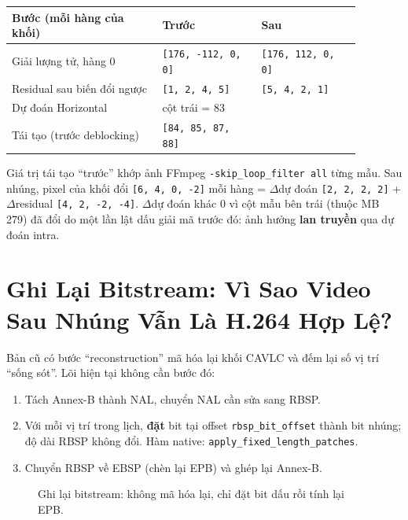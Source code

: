 \documentclass[11pt,a4paper]{article}
\begin{document}
\begin{center}
\small
\begin{tabular}{p{0.38\linewidth}p{0.25\linewidth}p{0.25\linewidth}}
\toprule
Bước (mỗi hàng của khối) & Trước & Sau \\
\midrule
Giải lượng tử, hàng 0 & \texttt{[176, -112, 0, 0]} & \texttt{[176, 112, 0, 0]} \\
Residual sau biến đổi ngược & \texttt{[1, 2, 4, 5]} & \texttt{[5, 4, 2, 1]} \\
Dự đoán Horizontal & cột trái = 83 & \\
Tái tạo (trước deblocking) & \texttt{[84, 85, 87, 88]} & \\
\bottomrule
\end{tabular}
\end{center}

Giá trị tái tạo ``trước'' khớp ảnh FFmpeg \texttt{-skip\_loop\_filter all} từng mẫu.
Sau nhúng, pixel của khối đổi \texttt{[6, 4, 0, -2]} mỗi hàng = \(\Delta\)dự đoán
\texttt{[2, 2, 2, 2]} + \(\Delta\)residual \texttt{[4, 2, -2, -4]}. \(\Delta\)dự đoán khác
0 vì cột mẫu bên trái (thuộc MB 279) đã đổi do một lần lật dấu giải mã trước đó:
ảnh hưởng \textbf{lan truyền} qua dự đoán intra.

\section{Ghi Lại Bitstream: Vì Sao Video Sau Nhúng Vẫn Là H.264 Hợp Lệ?}

Bản cũ có bước ``reconstruction'' mã hóa lại khối CAVLC và đếm lại số vị trí ``sống
sót''. Lõi hiện tại không cần bước đó:

\begin{enumerate}[leftmargin=*]
  \item Tách Annex-B thành NAL, chuyển NAL cần sửa sang RBSP.
  \item Với mỗi vị trí trong lịch, \textbf{đặt} bit tại offset
  \texttt{rbsp\_bit\_offset} thành bit nhúng; độ dài RBSP không đổi. Hàm native:
  \texttt{apply\_fixed\_length\_patches}.
  \item Chuyển RBSP về EBSP (chèn lại EPB) và ghép lại Annex-B.
\end{enumerate}

\begin{figure}[H]
\centering
{}
\caption{Ghi lại bitstream: không mã hóa lại, chỉ đặt bit dấu rồi tính lại EPB.}
\label{fig:reconstruction}
\end{figure}
\end{document}
